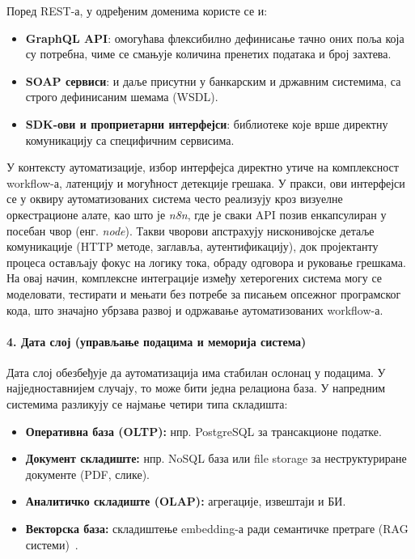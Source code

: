 Поред REST-а, у одређеним доменима користе се и:
\begin{itemize}
    \item \textbf{GraphQL API}: омогућава флексибилно дефинисање тачно оних поља која су потребна,
    чиме се смањује количина пренетих података и број захтева.
    \item \textbf{SOAP сервиси}: и даље присутни у банкарским и државним системима, са строго дефинисаним шемама (WSDL).
    \item \textbf{SDK-ови и проприетарни интерфејси}: библиотеке које врше директну комуникацију са специфичним сервисима.
\end{itemize}

У контексту аутоматизације, избор интерфејса директно утиче на комплексност workflow-а, латенцију
и могућност детекције грешака.
У пракси, ови интерфејси се у оквиру аутоматизованих система често реализују кроз визуелне оркестрационе алате,
као што је \textit{n8n}, где је сваки API позив енкапсулиран у посебан чвор (енг. \textit{node}).
Такви чворови апстрахују нисконивојске детаље комуникације (HTTP методе, заглавља, аутентификацију),
док пројектанту процеса остављају фокус на логику тока, обраду одговора и руковање грешкама.
На овај начин, комплексне интеграције између хетерогених система могу се моделовати, тестирати и мењати
без потребе за писањем опсежног програмског кода, што значајно убрзава развој и одржавање аутоматизованих workflow-а.



\paragraph*{4. Дата слој (управљање подацима и меморија система)}
Дата слој обезбеђује да аутоматизација има стабилан ослонац у подацима. У најједноставнијем случају,
то може бити једна релациона база. У напредним системима разликују се најмање четири типа складишта:
\begin{itemize}
    \item \textbf{Оперативна база (OLTP):} нпр. PostgreSQL за трансакционе податке.
    \item \textbf{Документ складиште:} нпр. NoSQL база или file storage за неструктуриране документе (PDF, слике).
    \item \textbf{Аналитичко складиште (OLAP):} агрегације, извештаји и БИ.
    \item \textbf{Векторска база:} складиштење embedding-а ради семантичке претраге (RAG системи)~\cite{johnson2019faiss,reimers2019sbert}.
\end{itemize}


